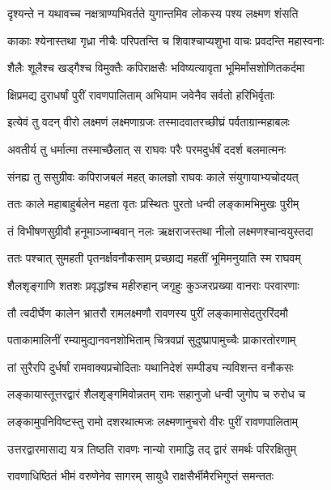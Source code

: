\twolineshloka
{दृश्यन्ते न यथावच्च नक्षत्राण्यभिवर्तते}
{युगान्तमिव लोकस्य पश्य लक्ष्मण शंसति} %

\twolineshloka
{काकाः श्येनास्तथा गृध्रा नीचैः परिपतन्ति च}
{शिवाश्चाप्यशुभा वाचः प्रवदन्ति महास्वनाः} %

\twolineshloka
{शैलैः शूलैश्च खड्गैश्च विमुक्तैः कपिराक्षसैः}
{भविष्यत्यावृता भूमिर्मांसशोणितकर्दमा} %

\twolineshloka
{क्षिप्रमद्य दुराधर्षां पुरीं रावणपालिताम्}
{अभियाम जवेनैव सर्वतो हरिभिर्वृताः} %

\twolineshloka
{इत्येवं तु वदन् वीरो लक्ष्मणं लक्ष्मणाग्रजः}
{तस्मादवातरच्छीघ्रं पर्वताग्रान्महाबलः} %

\twolineshloka
{अवतीर्य तु धर्मात्मा तस्माच्छैलात् स राघवः}
{परैः परमदुर्धर्षं ददर्श बलमात्मनः} %

\twolineshloka
{संनह्य तु ससुग्रीवः कपिराजबलं महत्}
{कालज्ञो राघवः काले संयुगायाभ्यचोदयत्} %

\twolineshloka
{ततः काले महाबाहुर्बलेन महता वृतः}
{प्रस्थितः पुरतो धन्वी लङ्कामभिमुखः पुरीम्} %

\twolineshloka
{तं विभीषणसुग्रीवौ हनूमाञ्जाम्बवान् नलः}
{ऋक्षराजस्तथा नीलो लक्ष्मणश्चान्वयुस्तदा} %

\twolineshloka
{ततः पश्चात् सुमहती पृतनर्क्षवनौकसाम्}
{प्रच्छाद्य महतीं भूमिमनुयाति स्म राघवम्} %

\twolineshloka
{शैलशृङ्गाणि शतशः प्रवृद्धांश्च महीरुहान्}
{जगृहुः कुञ्जरप्रख्या वानराः परवारणाः} %

\twolineshloka
{तौ त्वदीर्घेण कालेन भ्रातरौ रामलक्ष्मणौ}
{रावणस्य पुरीं लङ्कामासेदतुररिंदमौ} %

\twolineshloka
{पताकामालिनीं रम्यामुद्यानवनशोभिताम्}
{चित्रवप्रां सुदुष्प्रापामुच्चैः प्राकारतोरणाम्} %

\twolineshloka
{तां सुरैरपि दुर्धर्षां रामवाक्यप्रचोदिताः}
{यथानिदेशं सम्पीड्य न्यविशन्त वनौकसः} %

\twolineshloka
{लङ्कायास्तूत्तरद्वारं शैलशृङ्गमिवोन्नतम्}
{रामः सहानुजो धन्वी जुगोप च रुरोध च} %

\twolineshloka
{लङ्कामुपनिविष्टस्तु रामो दशरथात्मजः}
{लक्ष्मणानुचरो वीरः पुरीं रावणपालिताम्} %

\twolineshloka
{उत्तरद्वारमासाद्य यत्र तिष्ठति रावणः}
{नान्यो रामाद्धि तद् द्वारं समर्थः परिरक्षितुम्} %

\twolineshloka
{रावणाधिष्ठितं भीमं वरुणेनेव सागरम्}
{सायुधै राक्षसैर्भीमैरभिगुप्तं समन्ततः} %

